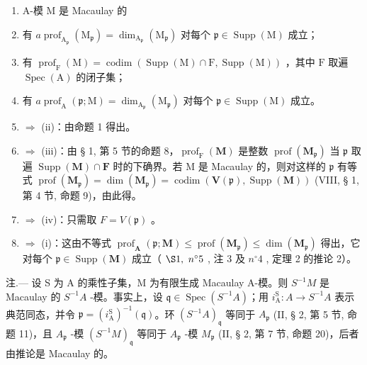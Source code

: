 \begin{enumerate}
\def\labelenumi{(\roman{enumi})}
\item
  A-模 M 是 Macaulay 的
\item
  有 \(a \operatorname{prof}_{\mathrm{A}_{\mathfrak{p}}}(\mathrm{M}_{\mathfrak{p}}) = \dim_{\mathrm{A}_{\mathfrak{p}}}(\mathrm{M}_{\mathfrak{p}})\) 对每个 \(\mathfrak{p} \in \operatorname{Supp}(\mathrm{M})\) 成立；
\item
  有 \(\operatorname{prof}_{\mathrm{F}}(\mathrm{M}) = \operatorname{codim}(\operatorname{Supp}(\mathrm{M}) \cap \mathrm{F}, \operatorname{Supp}(\mathrm{M}))\) ，其中 \(\mathrm{F}\) 取遍 \(\operatorname{Spec}(\mathrm{A})\) 的闭子集；
\item
  有 \(a \operatorname{prof}_{\mathrm{A}}(\mathfrak{p}; \mathrm{M}) = \dim_{\mathrm{A}_{\mathfrak{p}}}(\mathrm{M}_{\mathfrak{p}})\) 对每个 \(\mathfrak{p} \in \operatorname{Supp}(\mathrm{M})\) 成立。
\item
  \(\Rightarrow\) (ii)：由命题 1 得出。
\item
  \(\Rightarrow\) (iii)：由 § 1, 第 5 节的命题 8，\(\operatorname{prof}_{\mathrm{F}}(\mathbf{M})\) 是整数 \(\operatorname{prof}(\mathbf{M}_{\mathfrak{p}})\) 当 \(\mathfrak{p}\) 取遍 \(\operatorname{Supp}(\mathbf{M}) \cap \mathbf{F}\) 时的下确界。若 M 是 Macaulay 的，则对这样的 \(\mathfrak{p}\) 有等式 \(\operatorname{prof}(\mathbf{M}_{\mathfrak{p}}) = \dim(\mathbf{M}_{\mathfrak{p}}) = \operatorname{codim}(\mathbf{V}(\mathfrak{p}), \operatorname{Supp}(\mathbf{M}))\) (VIII, § 1, 第 4 节, 命题 9)，由此得。
\item
  \(\Rightarrow\) (iv)：只需取 \(F = V(\mathfrak{p})\) 。
\item
  \(\Rightarrow\) (i)：这由不等式 \(\operatorname{prof}_{\mathbf{A}}(\mathfrak{p};\mathbf{M})\leqslant\operatorname{prof}(\mathbf{M}_{\mathfrak{p}})\leqslant\dim(\mathbf{M}_{\mathfrak{p}})\) 得出，它对每个 \(\mathfrak{p}\in\operatorname{Supp}(\mathbf{M})\) 成立（ \(\S 1,\ n^{\circ}5\) , 注 3 及 \(n^{\circ}4\) , 定理 2 的推论 2）。
\end{enumerate}

注.--- 设 S 为 A 的乘性子集，M 为有限生成 Macaulay A-模。则 \(S^{-1}M\) 是 Macaulay 的 \(S^{-1}A\) -模。事实上，设 \(\mathfrak{q} \in \operatorname{Spec}(S^{-1}A)\)；用 \(i_{\mathrm{A}}^{\mathrm{S}} : A \to S^{-1}A\) 表示典范同态，并令 \(\mathfrak{p} = (i_{\mathrm{A}}^{\mathrm{S}})^{-1}(\mathfrak{q})\)。环 \((S^{-1}A)_{\mathfrak{q}}\) 等同于 \(A_{\mathfrak{p}}\) (II, § 2, 第 5 节, 命题 11)，且 \(A_{\mathfrak{p}}\) -模 \((S^{-1}M)_{\mathfrak{q}}\) 等同于 \(A_{\mathfrak{p}}\) -模 \(M_{\mathfrak{p}}\) (II, § 2, 第 7 节, 命题 20)，后者由推论是 Macaulay 的。

